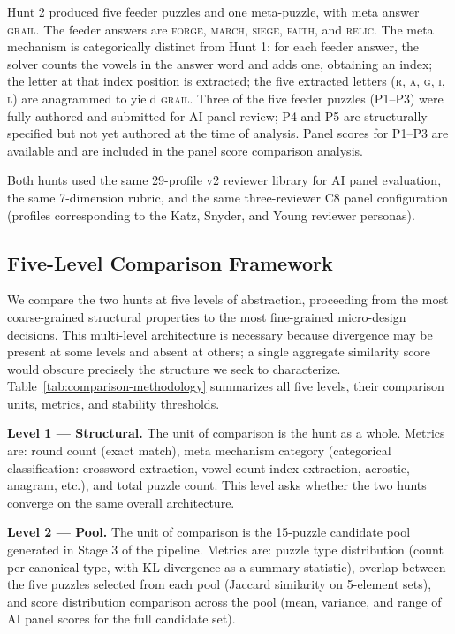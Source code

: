 Hunt 2 produced five feeder puzzles and one meta-puzzle, with meta answer \textsc{grail}. The feeder answers are \textsc{forge}, \textsc{march}, \textsc{siege}, \textsc{faith}, and \textsc{relic}. The meta mechanism is categorically distinct from Hunt 1: for each feeder answer, the solver counts the vowels in the answer word and adds one, obtaining an index; the letter at that index position is extracted; the five extracted letters (\textsc{r}, \textsc{a}, \textsc{g}, \textsc{i}, \textsc{l}) are anagrammed to yield \textsc{grail}. Three of the five feeder puzzles (P1--P3) were fully authored and submitted for AI panel review; P4 and P5 are structurally specified but not yet authored at the time of analysis. Panel scores for P1--P3 are available and are included in the panel score comparison analysis.

Both hunts used the same 29-profile v2 reviewer library for AI panel evaluation, the same 7-dimension rubric, and the same three-reviewer C8 panel configuration (profiles corresponding to the Katz, Snyder, and Young reviewer personas).

\subsection{Five-Level Comparison Framework}
\label{sec:comparison-framework}

We compare the two hunts at five levels of abstraction, proceeding from the most coarse-grained structural properties to the most fine-grained micro-design decisions. This multi-level architecture is necessary because divergence may be present at some levels and absent at others; a single aggregate similarity score would obscure precisely the structure we seek to characterize. Table~\ref{tab:comparison-methodology} summarizes all five levels, their comparison units, metrics, and stability thresholds.

\textbf{Level 1 --- Structural.} The unit of comparison is the hunt as a whole. Metrics are: round count (exact match), meta mechanism category (categorical classification: crossword extraction, vowel-count index extraction, acrostic, anagram, etc.), and total puzzle count. This level asks whether the two hunts converge on the same overall architecture.

\textbf{Level 2 --- Pool.} The unit of comparison is the 15-puzzle candidate pool generated in Stage 3 of the pipeline. Metrics are: puzzle type distribution (count per canonical type, with KL divergence as a summary statistic), overlap between the five puzzles selected from each pool (Jaccard similarity on 5-element sets), and score distribution comparison across the pool (mean, variance, and range of AI panel scores for the full candidate set).


